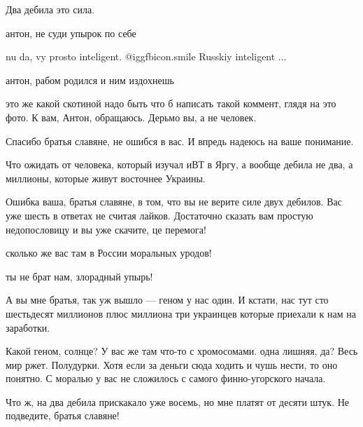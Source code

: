  
 
 
 
 

Два дебила это сила.

\begin{itemize} %
антон, не суди упырок по себе

nu da, vy prosto inteligent. @igg{fbicon.smile}  Russkiy inteligent ...

антон, рабом родился и ним издохнешь

это же какой скотиной надо быть что б написать такой коммент, глядя на это фото. К вам, Антон, обращаюсь. Дерьмо вы, а не человек.

Спасибо братья славяне, не ошибся в вас. И впредь надеюсь на ваше понимание.

Что ожидать от человека, который изучал иВТ в Яргу, а вообще дебила не два, а миллионы, которые живут восточнее Украины.

Ошибка ваша, братья славяне, в том, что вы не верите силе двух дебилов. Вас уже шесть в ответах не считая лайков.
Достаточно сказать вам простую недопословицу и вы уже скачите, це перемога!

сколько же вас там в России моральных уродов!

ты не брат нам, злорадный упырь!


А вы мне братья, так уж вышло — геном у нас один. И кстати, нас тут сто
шестьдесят миллионов плюс миллиона три украинцев которые приехали к нам на
заработки.


Какой геном, солнце? У вас же там что-то с хромосомами. одна лишняя, да? Весь
мир ржет. Полудурки. Хотя если за деньги сюда ходить и чушь нести, то оно
понятно. С моралью у вас не сложилось с самого финно-угорского начала.

Что ж, на два дебила прискакало уже восемь, но мне платят от десяти штук. Не подведите, братья славяне!


\end{itemize}
